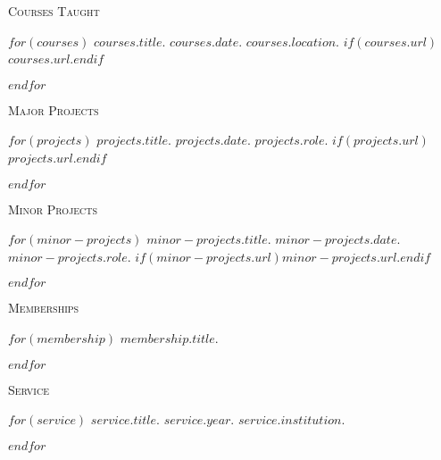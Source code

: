 \documentclass[11pt,article,oneside]{memoir}
\begin{document}
\medskip

\medskip
{}

\ind \textsc{Courses Taught}

\medskip

$for(courses)$
\ind $courses.title$. \emph{$courses.date$}. $courses.location$. $if(courses.url)$\href{$courses.url$}{$courses.url$}.$endif$

\smallskip

\pagebreak[1]
$endfor$

\medskip

\medskip
{}

\ind \textsc{Major Projects}

\medskip

$for(projects)$
\ind \emph{$projects.title$}. \emph{$projects.date$}. $projects.role$. $if(projects.url)$\href{$projects.url$}{$projects.url$}.$endif$

\smallskip
$endfor$

\medskip

\ind \textsc{Minor Projects}

\medskip

$for(minor-projects)$
\ind \emph{$minor-projects.title$}. \emph{$minor-projects.date$}. $minor-projects.role$. $if(minor-projects.url)$\href{$minor-projects.url$}{$minor-projects.url$}.$endif$
\smallskip

$endfor$

\medskip


\ind \textsc{Memberships}

\medskip

$for(membership)$
\ind $membership.title$.

\pagebreak[1]
$endfor$

\bigskip

\ind \textsc{Service}

$for(service)$
\ind $service.title$. \emph{$service.year$}. $service.institution$.

\pagebreak[1]
$endfor$

\medskip

\thispagestyle{jtmcolophon}
\end{document}
